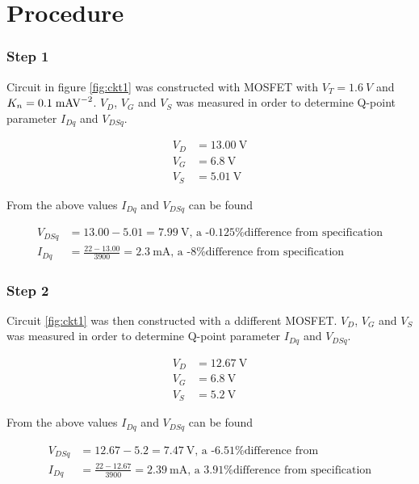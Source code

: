 \documentclass{article}
\begin{document}
\section*{Procedure}
\subsubsection*{Step 1}
Circuit in figure \ref{fig:ckt1} was constructed with MOSFET with $V_T=\SI{1.6}{V}$ and $K_n=0.1\text{\;mAV}^{-2}$. $V_D$, $V_G$ and $V_S$ was measured in order to determine Q-point parameter $I_{Dq}$ and $V_{DSq}$.

\begin{align*}
  V_D &= \SI{13.00}{\volt}\\
  V_G &= \SI{6.8}{\volt}\\
  V_S &= \SI{5.01}{\volt}
\end{align*}

From the above values $I_{Dq}$ and $V_{DSq}$ can be found

\begin{align*}
  V_{DSq} &= 13.00-5.01=\SI{7.99}{\volt}\text{, a -0.125\% difference from specification}\\
  I_{Dq}  &= \frac{22-13.00}{3900} = \SI{2.3}{\milli\ampere}\text{, a -8\% difference from specification}
\end{align*}

\subsubsection*{Step 2}
Circuit \ref{fig:ckt1} was then constructed with a ddifferent MOSFET. $V_D$, $V_G$ and $V_S$ was measured in order to determine Q-point parameter $I_{Dq}$ and $V_{DSq}$.

\begin{align*}
  V_D &= \SI{12.67}{\volt}\\
  V_G &= \SI{6.8}{\volt}\\
  V_S &= \SI{5.2}{\volt}
\end{align*}

From the above values $I_{Dq}$ and $V_{DSq}$ can be found

\begin{align*}
  V_{DSq} &= 12.67-5.2=\SI{7.47}{\volt}\text{, a -6.51\% difference from }\\
  I_{Dq}  &= \frac{22-12.67}{3900} = \SI{2.39}{\milli\ampere}\text{, a 3.91\% difference from specification}
\end{align*}

\newpage
\end{document}
